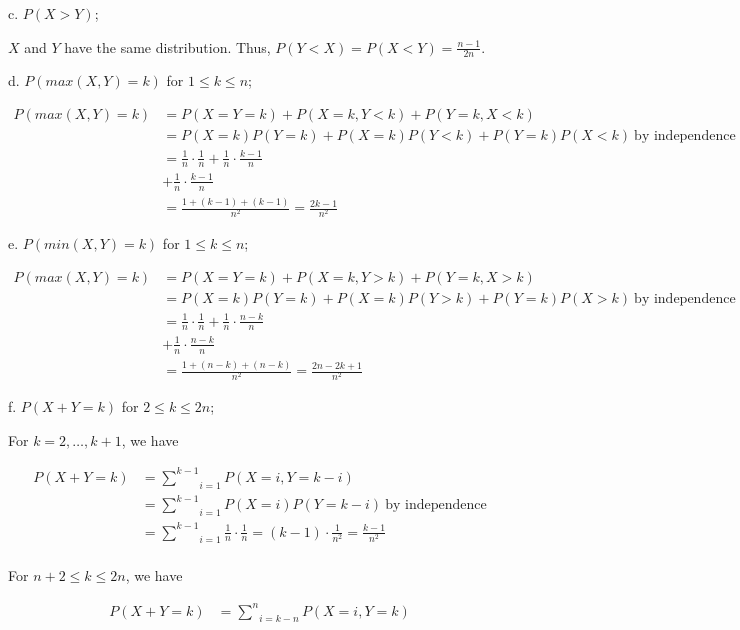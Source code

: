 \documentclass{article}
\begin{document}
\indent\indent c. $P(X>Y)$;

{\color{blue}

$X$ and $Y$ have the same distribution. Thus, $P(Y<X)=P(X<Y)=\frac{n-1}{2n}$.

}

\indent\indent d. $P(max(X,Y)=k)$ for $1\le k\le n$;

{\color{blue}

\begin{align*}
    P(max(X,Y)=k)&=P(X=Y=k)+P(X=k,Y<k)+P(Y=k,X<k)\\
    &=P(X=k)P(Y=k)+P(X=k)P(Y<k)+P(Y=k)P(X<k)\ \text{by independence}\\
    &=\frac{1}{n}\cdot\frac{1}{n}+\frac{1}{n}\cdot\frac{k-1}{n}\\
    &+\frac{1}{n}\cdot\frac{k-1}{n}\\
    &=\frac{1+(k-1)+(k-1)}{n^2}=\frac{2k-1}{n^2}
\end{align*}

}

\indent\indent e. $P(min(X,Y)=k)$ for $1\le k\le n$;

{\color{blue}


\begin{align*}
    P(max(X,Y)=k)&=P(X=Y=k)+P(X=k,Y>k)+P(Y=k,X>k)\\
    &=P(X=k)P(Y=k)+P(X=k)P(Y>k)+P(Y=k)P(X>k)\ \text{by independence}\\
    &=\frac{1}{n}\cdot\frac{1}{n}+\frac{1}{n}\cdot\frac{n-k}{n}\\
    &+\frac{1}{n}\cdot\frac{n-k}{n}\\
    &=\frac{1+(n-k)+(n-k)}{n^2}=\frac{2n-2k+1}{n^2}
\end{align*}


}

\indent\indent f. $P(X+Y=k)$ for $2\le k\le 2n$;

{\color{blue}

For $k=2,\ldots,k+1$, we have


\begin{align*}
P(X+Y=k)&=\underset{i=1}{\overset{k-1}{\sum}}P(X=i,Y=k-i)\\
    &=\underset{i=1}{\overset{k-1}{\sum}}P(X=i)P(Y=k-i)\ \text{by independence}\\
    &=\underset{i=1}{\overset{k-1}{\sum}}\frac{1}{n}\cdot\frac{1}{n}=(k-1)\cdot\frac{1}{n^2}=\frac{k-1}{n^2}\\
\end{align*}


For $n+2\le k\le 2n$, we have


\begin{align*}
    P(X+Y=k)&=\underset{i=k-n}{\overset{n}{\sum}}P(X=i,Y=k)
\end{align*}

}
\end{document}
